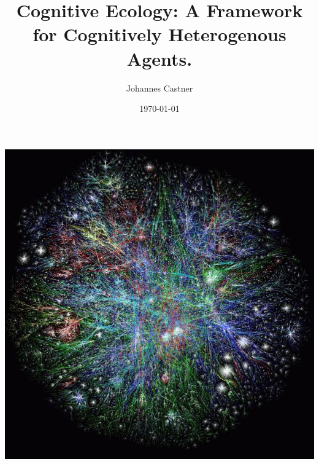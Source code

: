 \documentclass{beamer}
\date{\today}
\begin{document}
\title{Cognitive Ecology: A Framework for Cognitively Heterogenous Agents.}



\author{Johannes Castner}
\begin{frame}
\titlepage
\begin{center}
\includegraphics[scale=0.1]{complexity.jpeg}
\end{center}

\end{frame}

\end{document}
